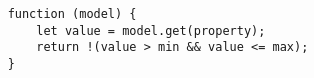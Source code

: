 
\begin{lstlisting}
	function (model) {
		let value = model.get(property);
		return !(value > min && value <= max);
	}
\end{lstlisting}
